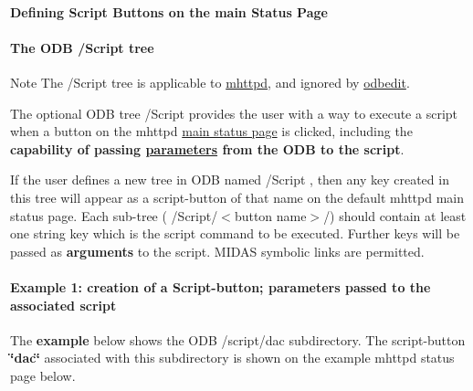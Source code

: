 \par
\par


 \par
 \label{index_end}
\hypertarget{index_end}{}
 \paragraph{Defining Script Buttons on the main Status Page}\label{RC_mhttpd_defining_script_buttons}
\par




\label{RC_mhttpd_defining_script_buttons_idx_ODB_tree_Script}
\hypertarget{RC_mhttpd_defining_script_buttons_idx_ODB_tree_Script}{}
 \hypertarget{RC_mhttpd_defining_script_buttons_RC_odb_script_tree}{}\paragraph{The ODB /Script tree}\label{RC_mhttpd_defining_script_buttons_RC_odb_script_tree}
\begin{DoxyNote}{Note}
The /Script tree is applicable to \hyperlink{RC_mhttpd}{mhttpd}, and ignored by \hyperlink{RC_odbedit}{odbedit}.
\end{DoxyNote}
The optional ODB tree /Script provides the user with a way to execute a script when a button on the mhttpd \hyperlink{RC_mhttpd_Main_Status_page_RC_mhttpd_main_status}{main status page} is clicked, including the {\bfseries capability of passing \hyperlink{structparameters}{parameters} from the ODB to the script}.

\par
 If the user defines a new tree in ODB named /Script , then any key created in this tree will appear as a script-\/button of that name on the default mhttpd main status page. Each sub-\/tree ( /Script/$<$button name$>$/) should contain at least one string key which is the script command to be executed. Further keys will be passed as {\bfseries  arguments } to the script. MIDAS symbolic links are permitted.\hypertarget{RC_mhttpd_defining_script_buttons_RC_odb_script_example1}{}\paragraph{Example 1: creation of a Script-\/button; parameters passed to the associated script}\label{RC_mhttpd_defining_script_buttons_RC_odb_script_example1}
The {\bfseries  example } below shows the ODB /script/dac subdirectory. The script-\/button {\bfseries \char`\"{}dac\char`\"{}} associated with this subdirectory is shown on the example mhttpd status page below.

